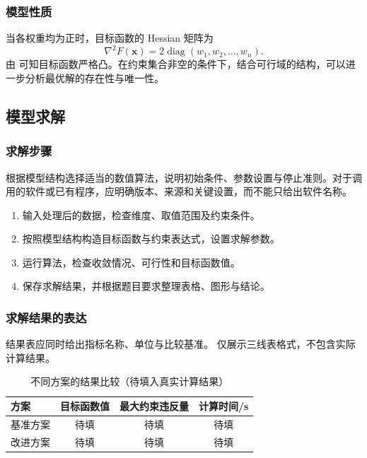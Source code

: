 \documentclass{gmcmthesis}
\begin{document}
\subsubsection{模型性质}
当各权重均为正时，目标函数的 Hessian 矩阵为
\begin{equation}
  \nabla^2F(\bm{x})
  =2\operatorname{diag}(w_1,w_2,\ldots,w_n).
  \label{eq:hessian}
\end{equation}
由 可知目标函数严格凸。在约束集合非空的条件下，结合可行域的结构，可以进一步分析最优解的存在性与唯一性。

\subsection{模型求解}

\subsubsection{求解步骤}
根据模型结构选择适当的数值算法，说明初始条件、参数设置与停止准则。对于调用的软件或已有程序，应明确版本、来源和关键设置，而不能只给出软件名称。

\begin{enumerate}
  \item 输入处理后的数据，检查维度、取值范围及约束条件。
  \item 按照模型结构构造目标函数与约束表达式，设置求解参数。
  \item 运行算法，检查收敛情况、可行性和目标函数值。
  \item 保存求解结果，并根据题目要求整理表格、图形与结论。
\end{enumerate}

\subsubsection{求解结果的表达}
结果表应同时给出指标名称、单位与比较基准。 仅展示三线表格式，不包含实际计算结果。

\begin{table}[htbp]
  \centering
  \caption{不同方案的结果比较（待填入真实计算结果）}
  \label{tab:results}
  \begin{tabularx}{0.88\linewidth}{Xccc}
    \toprule
    方案 & 目标函数值 & 最大约束违反量 & 计算时间/s\\
    \midrule
    基准方案 & 待填 & 待填 & 待填\\
    改进方案 & 待填 & 待填 & 待填\\
    \bottomrule
  \end{tabularx}
\end{table}
\end{document}
